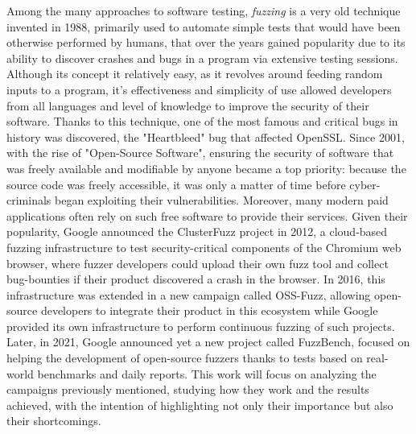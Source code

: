 \newline \newline
Among the many approaches to software testing, \textit{fuzzing} is a very old technique invented in 1988, primarily used to automate simple tests that would have been otherwise performed by humans, that over the years gained popularity due to its ability to discover crashes and bugs in a program via extensive testing sessions. Although its concept it relatively easy, as it revolves around feeding random inputs to a program, it's effectiveness and simplicity of use allowed developers from all languages and level of knowledge to improve the security of their software.
\newline
Thanks to this technique, one of the most famous and critical bugs in history was discovered, the "Heartbleed" bug that affected OpenSSL.
\newline \newline
Since 2001, with the rise of "Open-Source Software", ensuring the security of software that was freely available and modifiable by anyone became a top priority: because the source code was freely accessible, it was only a matter of time before cyber-criminals began exploiting their vulnerabilities. Moreover, many modern paid applications often rely on such free software to provide their services. 
\newline
Given their popularity, Google announced the ClusterFuzz project in 2012, a cloud-based fuzzing infrastructure to test security-critical components of the Chromium web browser, where fuzzer developers could upload their own fuzz tool and collect bug-bounties if their product discovered a crash in the browser.
\newline
In 2016, this infrastructure was extended in a new campaign called OSS-Fuzz, allowing open-source developers to integrate their product in this ecosystem while Google provided its own infrastructure to perform continuous fuzzing of such projects.
\newline
Later, in 2021, Google announced yet a new project called FuzzBench, focused on helping the development of open-source fuzzers thanks to tests based on real-world benchmarks and daily reports.
\newline \newline
This work will focus on analyzing the campaigns previously mentioned, studying how they work and the results achieved, with the intention of highlighting not only their importance but also their shortcomings.





